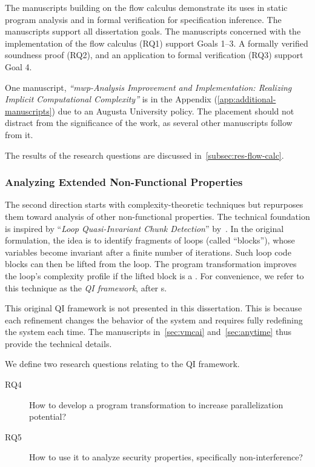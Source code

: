 The manuscripts building on the flow calculus demonstrate its uses in static
program analysis and in formal verification for specification inference. The
manuscripts support all dissertation goals. The manuscripts concerned with the
implementation of the flow calculus (RQ1) support Goals 1--3. A formally
verified soundness proof (RQ2), and an application to formal verification (RQ3)
support Goal 4.

One manuscript, \emph{\enquote{mwp-Analysis Improvement and Implementation:
Realizing Implicit Computational Complexity}} is in the Appendix
(\autoref{app:additional-manuscripts}) due to an Augusta University policy. The
placement should not distract from the significance of the work, as several
other manuscripts follow from it.

The results of the research questions are discussed
in~\autoref{subsec:res-flow-calc}.

\subsubsection{Analyzing Extended Non-Functional Properties}

The second direction starts with complexity-theoretic techniques but repurposes
them toward analysis of other non-functional properties. The technical
foundation is inspired by \enquote{\emph{Loop Quasi-Invariant Chunk Detection}}
by~\textcite{moyen20172}. In the original formulation, the idea is to identify
fragments of loops (called \enquote{blocks}), whose variables become invariant
after a finite number of iterations. Such loop  code blocks
can then be lifted from the loop. The program transformation improves the loop's
complexity profile if the lifted block is a . For convenience,
we refer to this technique as the \emph{QI framework}, after
s.

This original QI framework is not presented in this dissertation. This is
because each refinement changes the behavior of the system and requires fully
redefining the system each time. The manuscripts in~\autoref{sec:vmcai}
and~\autoref{sec:anytime} thus provide the technical details.

We define two research questions relating to the QI framework.

\begin{description}

\item[RQ4] How to develop a program transformation to increase parallelization
potential?

\item[RQ5] How to use it to analyze security properties, specifically
non-interference?

\end{description}

